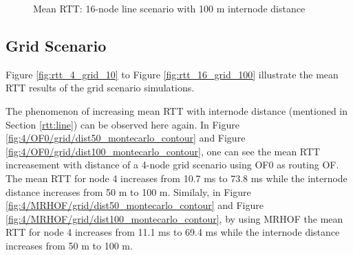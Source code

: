 \begin{figure}[p]
  \centering
    \leavevmode
  \caption{Mean RTT: 16-node line scenario with 100 m internode distance}
 \label{fig:rtt_16_line_100}
\end{figure}

\subsection{Grid Scenario}
\label{rtt:grid}

Figure \ref{fig:rtt_4_grid_10} to Figure \ref{fig:rtt_16_grid_100} illustrate the mean RTT results of the grid scenario simulations.
\newline

The phenomenon of increasing mean RTT with internode distance (mentioned in Section \ref{rtt:line}) can be observed here again. In Figure \ref{fig:4/OF0/grid/dist50_montecarlo_contour} and Figure \ref{fig:4/OF0/grid/dist100_montecarlo_contour}, one can see the mean RTT increasement with distance of a 4-node grid scenario using OF0 as routing OF. The mean RTT for node 4 increases from  10.7 ms to 73.8 ms while the internode distance increases from 50 m to 100 m. Similaly, in Figure \ref{fig:4/MRHOF/grid/dist50_montecarlo_contour} and Figure \ref{fig:4/MRHOF/grid/dist100_montecarlo_contour}, by using MRHOF the mean RTT for node 4 increases from  11.1 ms to 69.4 ms while the internode distance increases from 50 m to 100 m.
\newline

